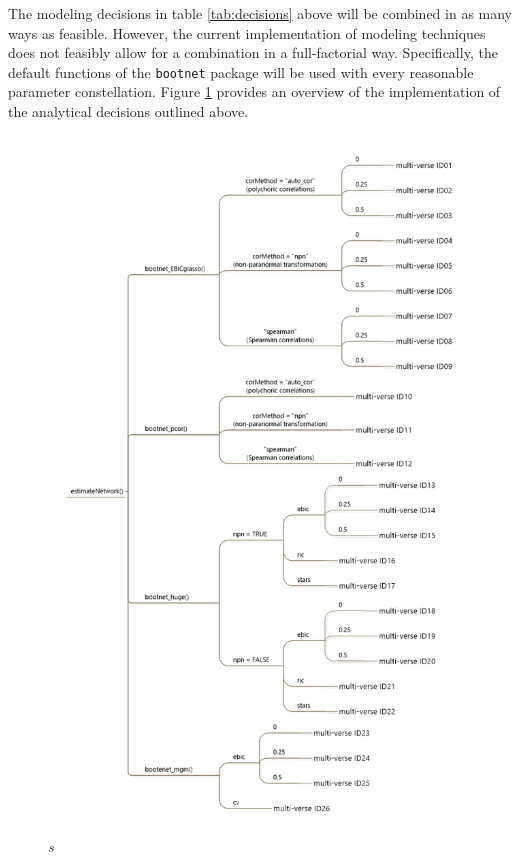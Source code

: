 \documentclass[a4paper,12pt]{article} %
\begin{document}
		The modeling decisions in table \ref{tab:decisions} above will be combined in as many ways as feasible.
		However, the current implementation of modeling techniques does not feasibly allow for a combination in a full-factorial way.
		Specifically, the default functions of the \texttt{bootnet} package  will be used with every reasonable parameter constellation.
		Figure \ref{fig:multiverse} provides an overview of the implementation of the analytical decisions outlined above. 

\begin{figure}[h!]
	\caption{\label{fig:multiverse}\protect\linebreak[1]\textit{s}}
	\centering
	\includegraphics[width=\linewidth]{../figures/multiverse.png}
\end{figure}
\end{document}
